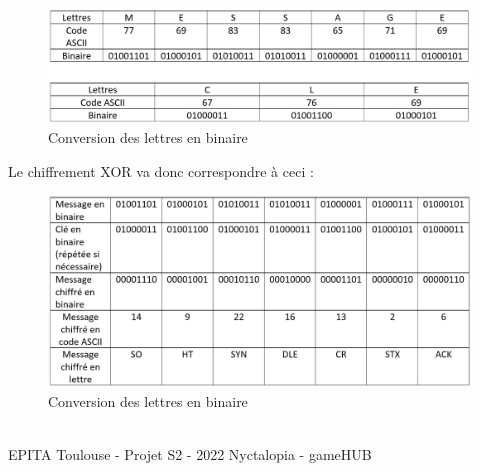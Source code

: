     \begin{figure}[H]
        \centering
        \includegraphics[width=15cm]{img/gameplay/clemsgtranscript.PNG}
        \caption{ Conversion des lettres en binaire}
        \label{fig:transciption}
    \end{figure}
    
Le chiffrement XOR va donc correspondre à ceci :
 \newline
    \begin{figure}[H]
        \centering
        \includegraphics[width=17cm]{img/gameplay/Xorencryot.PNG}
        \caption{ Conversion des lettres en binaire}
        \label{fig:XORencryption}
    \end{figure}

    
    
\vfill
\noindent\makebox[\linewidth]{\rule{.8\paperwidth}{.6pt}}\\[0.2cm]
EPITA Toulouse - Projet S2 - 2022 \hfill Nyctalopia - gameHUB
\noindent\makebox[\linewidth]{\rule{.8\paperwidth}{.6pt}}
\newpage

